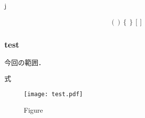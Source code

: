 \documentclass[a4paper,fleqn]{jsarticle}
\begin{document}
\begin{screen}
 j
\end{screen}

\begin{align}
 \left( \right)
\left\{ \right\}
\left[ \right]
\end{align}

\subsubsection{test}
今回の範囲．

式


%




 \begin{figure}[htbp]
  \begin{center}
   \texttt{[image: test.pdf]}
   \caption{Figure }
   \label{fig1}
  \end{center}
\end{figure}

\end{document}
